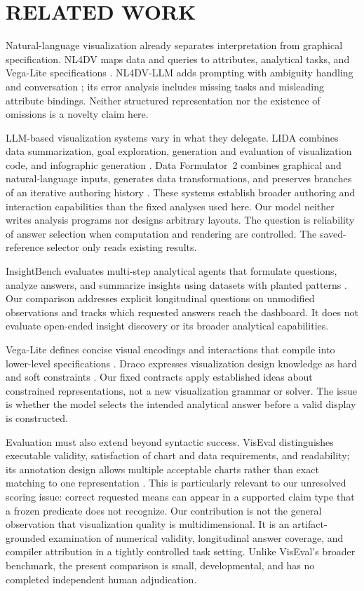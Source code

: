 \section{\uppercase{Related Work}}
\label{sec:related}
\noindent Natural-language visualization already separates interpretation from graphical specification. NL4DV maps data and queries to attributes, analytical tasks, and Vega-Lite specifications \cite{nl4dv}. NL4DV-LLM adds prompting with ambiguity handling and conversation \cite{sah2024}; its error analysis includes missing tasks and misleading attribute bindings. Neither structured representation nor the existence of omissions is a novelty claim here.\draftassist

LLM-based visualization systems vary in what they delegate. LIDA combines data summarization, goal exploration, generation and evaluation of visualization code, and infographic generation \cite{lida}. Data Formulator~2 combines graphical and natural-language inputs, generates data transformations, and preserves branches of an iterative authoring history \cite{dataformulator2}. These systems establish broader authoring and interaction capabilities than the fixed analyses used here. Our model neither writes analysis programs nor designs arbitrary layouts. The question is reliability of answer selection when computation and rendering are controlled. The saved-reference selector only reads existing results.

InsightBench evaluates multi-step analytical agents that formulate questions, analyze answers, and summarize insights using datasets with planted patterns \cite{insightbench}. Our comparison addresses explicit longitudinal questions on unmodified observations and tracks which requested answers reach the dashboard. It does not evaluate open-ended insight discovery or its broader analytical capabilities.

Vega-Lite defines concise visual encodings and interactions that compile into lower-level specifications \cite{vegalite}. Draco expresses visualization design knowledge as hard and soft constraints \cite{draco}. Our fixed contracts apply established ideas about constrained representations, not a new visualization grammar or solver. The issue is whether the model selects the intended analytical answer before a valid display is constructed.

Evaluation must also extend beyond syntactic success. VisEval distinguishes executable validity, satisfaction of chart and data requirements, and readability; its annotation design allows multiple acceptable charts rather than exact matching to one representation \cite{viseval}. This is particularly relevant to our unresolved scoring issue: correct requested means can appear in a supported claim type that a frozen predicate does not recognize. Our contribution is not the general observation that visualization quality is multidimensional. It is an artifact-grounded examination of numerical validity, longitudinal answer coverage, and compiler attribution in a tightly controlled task setting. Unlike VisEval's broader benchmark, the present comparison is small, developmental, and has no completed independent human adjudication.


